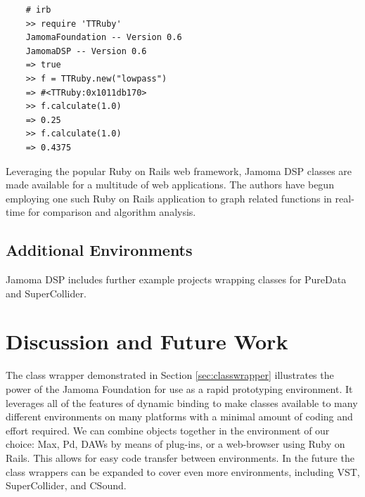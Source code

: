 \documentclass[twoside,10pt]{article}
\begin{document}

\begin{lstlisting}
    # irb
    >> require 'TTRuby'
    JamomaFoundation -- Version 0.6
    JamomaDSP -- Version 0.6
    => true
    >> f = TTRuby.new("lowpass")
    => #<TTRuby:0x1011db170>
    >> f.calculate(1.0)
    => 0.25
    >> f.calculate(1.0)
    => 0.4375
\end{lstlisting}

\noindent Leveraging the popular Ruby on Rails web framework, Jamoma DSP classes are made available for a multitude of web applications.  The authors have begun employing one such Ruby on Rails application to graph related functions in real-time for comparison and algorithm analysis.



\subsection{Additional Environments}

Jamoma DSP includes further example projects wrapping classes for PureData and SuperCollider.




\section{Discussion and Future Work} %

The class wrapper demonstrated in Section \ref{sec:classwrapper} illustrates the power of the Jamoma Foundation for use as a rapid prototyping environment.  It leverages all of the features of dynamic binding to make classes available to many different environments on many platforms with a minimal amount of coding and effort required.  We can combine objects together in the environment of our choice: Max, Pd, DAWs by means of plug-ins, or a web-browser using Ruby on Rails.  This allows for easy code transfer between environments.  In the future the class wrappers can be expanded to cover even more environments, including VST, SuperCollider, and CSound.

\end{document}
